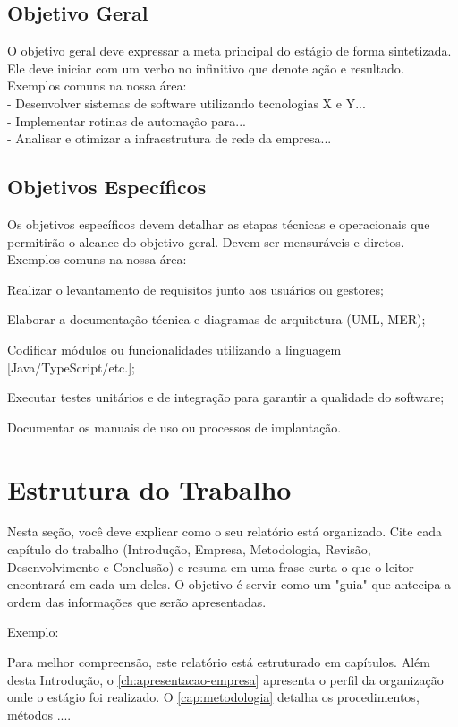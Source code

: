 \subsection{Objetivo Geral}
\label{subsec:objective-geral}

O objetivo geral deve expressar a meta principal do estágio de forma sintetizada.
Ele deve iniciar com um verbo no infinitivo que denote ação e resultado. Exemplos comuns na nossa área:\\
 - Desenvolver sistemas de software utilizando tecnologias X e Y...\\
 - Implementar rotinas de automação para...\\
 - Analisar e otimizar a infraestrutura de rede da empresa...

\subsection{Objetivos Específicos}
\label{subsec:objetivos-especificos}

Os objetivos específicos devem detalhar as etapas técnicas e operacionais que permitirão o alcance do objetivo geral. 
Devem ser mensuráveis e diretos. Exemplos comuns na nossa área:

\begin{alineas}
    \item Realizar o levantamento de requisitos junto aos usuários ou gestores;
    \item Elaborar a documentação técnica e diagramas de arquitetura (UML, MER);
    \item Codificar módulos ou funcionalidades utilizando a linguagem [Java/TypeScript/etc.];
    \item Executar testes unitários e de integração para garantir a qualidade do software;
    \item Documentar os manuais de uso ou processos de implantação.
\end{alineas}




\section{Estrutura do Trabalho}
\label{sec:estrutura}
Nesta seção, você deve explicar como o seu relatório está organizado.
Cite cada capítulo do trabalho (Introdução, Empresa, Metodologia, Revisão, Desenvolvimento e Conclusão) e 
resuma em uma frase curta o que o leitor encontrará em cada um deles. 
O objetivo é servir como um "guia" que antecipa a ordem das informações que serão apresentadas.

Exemplo:

Para melhor compreensão, este relatório está estruturado em capítulos. Além desta Introdução,
o \autoref{ch:apresentacao-empresa} apresenta o perfil da organização onde o estágio foi realizado. 
O \autoref{cap:metodologia} detalha os procedimentos, métodos ....